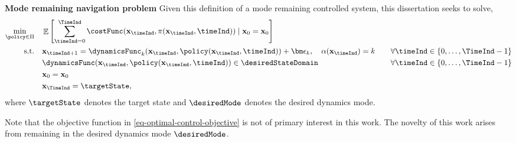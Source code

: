 \documentclass{mimosis-class/mimosis}
\numberwithin{equation}{chapter}
\DeclareMathOperator{\E}{\mathbb{E}}
\newcommand{\modeInd}{\ensuremath{k}}
\newcommand{\mode}[1]{\ensuremath{#1_{\modeInd}}}
\newcommand{\state}{\ensuremath{\mathbf{x}}}
\newcommand{\modeVar}{\ensuremath{\alpha}}
\begin{document}
\begin{myquote}
\textbf{Mode remaining navigation problem}
Given this definition of a mode remaining controlled system, this dissertation seeks to solve,
\begin{subequations} \label{eq-main-problem}
\begin{align}
\min_{\policy \in \Pi} \quad
&\E \left[ \sum_{\timeInd=0}^{\TimeInd} \costFunc(\state_{\timeInd}, \pi(\state_{\timeInd}, \timeInd)) \mid \state_0=\state_0 \right] \\
\text{s.t.} \quad &\state_{\timeInd+1} = \mode{\dynamicsFunc}(\state_\timeInd, \policy(\state_\timeInd, \timeInd)) + \mode{\bm\epsilon},
\quad \modeVar(\state_{\timeInd}) = \modeInd \quad &\forall \timeInd \in \{0, \ldots, \TimeInd-1\} \\
&\dynamicsFunc(\state_{\timeInd}, \policy(\state_{\timeInd}, \timeInd))
\in \desiredStateDomain \quad &\forall \timeInd \in \{0, \ldots, \TimeInd-1\} \\
&\state_{0} = \state_0 \\
&\state_\TimeInd = \targetState,
\end{align}
\end{subequations}
where $\targetState$ denotes the target state and $\desiredMode$ denotes the desired dynamics mode.
\end{myquote}
Note that the objective function in \cref{eq-optimal-control-objective} is not of primary interest in this work.
The novelty of this work arises from remaining in the desired dynamics mode \(\desiredMode\).
\end{document}
